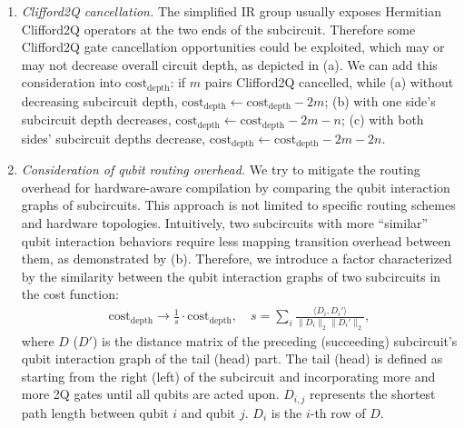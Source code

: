 \documentclass[conference,9pt]{IEEEtran}
\newcommand{\dquote}[1]{``#1''}
\newcommand{\SWAP}{\mathrm{SWAP}}
\newcommand{\CNOT}{\mathrm{CNOT}}
\begin{document}
\begin{enumerate}
        \item \emph{Clifford2Q cancellation.} The simplified IR group usually exposes Hermitian Clifford2Q operators at the two ends of the subcircuit. Therefore some Clifford2Q gate cancellation opportunities could be exploited, which may or may not decrease overall circuit depth, as depicted in  (a). We can add this consideration into $\mathrm{cost}_\mathrm{depth}$: if $m$ pairs Clifford2Q cancelled, while (a) without decreasing subcircuit depth, $\mathrm{cost}_\mathrm{depth} \gets \mathrm{cost}_\mathrm{depth} - 2m$; (b) with one side's subcircuit depth decreases, $\mathrm{cost}_\mathrm{depth} \gets \mathrm{cost}_\mathrm{depth} -2m -n$; (c) with both sides' subcircuit depths decrease, $\mathrm{cost}_\mathrm{depth} \gets \mathrm{cost}_\mathrm{depth} - 2m -2n$.
        \item \emph{Consideration of qubit routing overhead.} %
        We try to mitigate the routing overhead for hardware-aware compilation by comparing the qubit interaction graphs of subcircuits. This approach is not limited to specific routing schemes %
        and hardware topologies. Intuitively, two subcircuits with more \dquote{similar} qubit interaction behaviors require less mapping transition overhead between them, as demonstrated by  (b). Therefore, we introduce a factor characterized by the similarity between the qubit interaction graphs of two subcircuits in the cost function:
        \begin{align}
            \mathrm{cost}_\mathrm{depth} \rightarrow \frac 1 s \cdot \mathrm{cost}_\mathrm{depth},\quad s = \sum_i \frac{\langle D_i, D_i'\rangle}{\lVert D_i \rVert_2 \lVert D_i' \rVert_2},
        \end{align}
        where $D$ ($D'$) is the distance matrix of the preceding (succeeding) subcircuit's qubit interaction graph of the tail (head) part. The tail (head) is defined as starting from the right (left) of the subcircuit and incorporating more and more 2Q gates until all qubits are acted upon. $D_{i,j}$ represents the shortest path length between qubit $i$ and qubit $j$. $D_i$ is the $i$-th row of $D$.
    \end{enumerate}
\end{document}

